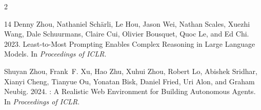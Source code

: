 \documentclass[11pt,a4paper]{article}
\begin{document}
\begin{multicols}{2}
\begin{thebibliography}{14}
Denny Zhou, Nathaniel Sch{\"a}rli, Le Hou, Jason Wei, Nathan Scales, Xuezhi Wang, Dale Schuurmans, Claire Cui, Olivier Bousquet, Quoc Le, and Ed Chi. 2023.
\newblock Least-to-Most Prompting Enables Complex Reasoning in Large Language Models.
\newblock In \emph{Proceedings of ICLR}.

Shuyan Zhou, Frank~F. Xu, Hao Zhu, Xuhui Zhou, Robert Lo, Abishek Sridhar, Xianyi Cheng, Tianyue Ou, Yonatan Bisk, Daniel Fried, Uri Alon, and Graham Neubig. 2024.
: A Realistic Web Environment for Building Autonomous Agents.
\newblock In \emph{Proceedings of ICLR}.

\end{thebibliography}

\end{multicols}
\end{document}
